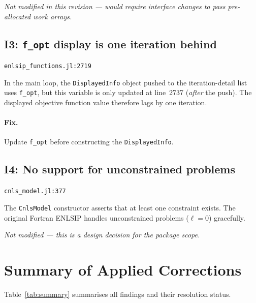 \documentclass[11pt, a4paper]{article}
\newcommand{\juliaref}[2]{\texttt{#1:#2}}
\begin{document}
\medskip\noindent
\textit{Not modified in this revision --- would require interface changes
to pass pre-allocated work arrays.}

\subsection{I3: \texttt{f\_opt} display is one iteration behind}
\label{sec:i3}

\juliaref{enlsip\_functions.jl}{2719}

In the main loop, the \texttt{DisplayedInfo} object pushed to the
iteration-detail list uses \texttt{f\_opt}, but this variable is only
updated at line~2737 (\emph{after} the push).  The displayed objective
function value therefore lags by one iteration.

\paragraph{Fix.}
Update \texttt{f\_opt} before constructing the \texttt{DisplayedInfo}.

\subsection{I4: No support for unconstrained problems}
\label{sec:i4}

\juliaref{cnls\_model.jl}{377}

The \texttt{CnlsModel} constructor asserts that at least one constraint
exists.  The original Fortran ENLSIP handles unconstrained problems
($\ell = 0$) gracefully.

\medskip\noindent
\textit{Not modified --- this is a design decision for the package scope.}

\section{Summary of Applied Corrections}
\label{sec:summary}

Table~\ref{tab:summary} summarises all findings and their resolution status.
\end{document}

